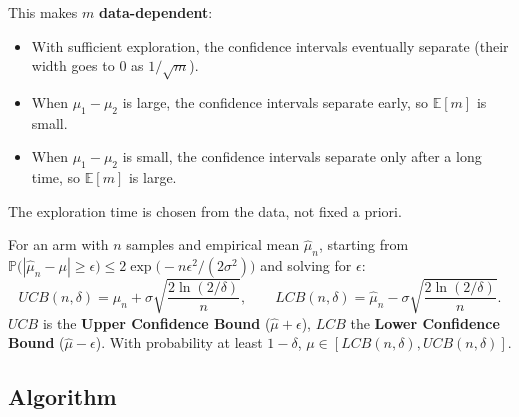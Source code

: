 This makes $m$ \textbf{data-dependent}:
\begin{itemize}
    \item With sufficient exploration, the confidence intervals eventually separate (their width goes to $0$ as $1/\sqrt{m}$).
    \item When $\mu_1 - \mu_2$ is large, the confidence intervals separate early, so $\mathbb{E}[m]$ is small.
    \item When $\mu_1 - \mu_2$ is small, the confidence intervals separate only after a long time, so $\mathbb{E}[m]$ is large.
\end{itemize}
The exploration time is chosen from the data, not fixed a priori.

\begin{definition}
For an arm with $n$ samples and empirical mean $\hat{\mu}_n$, starting from $\mathbb{P}\big(|\hat{\mu}_n - \mu| \geq \epsilon\big) \leq 2\exp\big(-n\epsilon^2/(2\sigma^2)\big)$ and solving for $\epsilon$:
\[
UCB(n, \delta) = \hat{\mu}_n + \sigma\sqrt{\frac{2\ln(2/\delta)}{n}}, \qquad LCB(n, \delta) = \hat{\mu}_n - \sigma\sqrt{\frac{2\ln(2/\delta)}{n}}.
\]
$UCB$ is the \textbf{Upper Confidence Bound} ($\hat{\mu} + \epsilon$), $LCB$ the \textbf{Lower Confidence Bound} ($\hat{\mu} - \epsilon$). With probability at least $1 - \delta$, $\mu \in [LCB(n,\delta), UCB(n,\delta)]$.
\end{definition}

\subsection{Algorithm}

